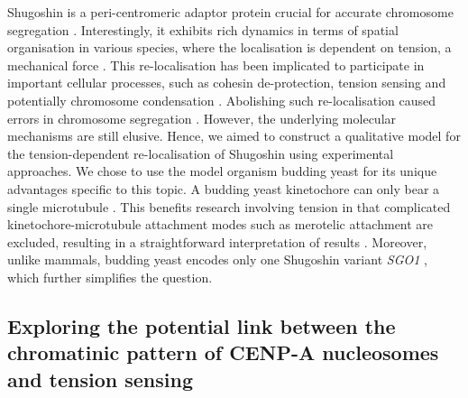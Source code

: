 Shugoshin is a peri-centromeric adaptor protein crucial for accurate chromosome segregation \citep{Marston2015, Zhang2020FunctioningMitosis}. Interestingly, it exhibits rich dynamics in terms of spatial organisation in various species, where the localisation is dependent on tension, a mechanical force \citep{Huang2007, Lee2008, Liu2013, Asai2020, Lee2008, Gomez2007, Eshleman2014, Nerusheva2014, Paldi2020ConvergentPericentromeres, Clarke2005, Kawashima2007}. This re-localisation has been implicated to participate in important cellular processes, such as cohesin de-protection, tension sensing and potentially chromosome condensation \citep{Indjeian2005a, Nerusheva2014, Su2021SumoylationAnaphase, Lee2008, Liu2013, Leonard2015, Kruitwagen2018}. Abolishing such re-localisation caused errors in chromosome segregation \citep{Su2021SumoylationAnaphase, Liu2013}. However, the underlying molecular mechanisms are still elusive. Hence, we aimed to construct a qualitative model for the tension-dependent re-localisation of Shugoshin using experimental approaches. We chose to use the model organism budding yeast for its unique advantages specific to this topic. A budding yeast kinetochore can only bear a single microtubule \citep{Biggins2013TheKinetochore}. This benefits research involving tension in that complicated kinetochore-microtubule attachment modes such as merotelic attachment are excluded, resulting in a straightforward interpretation of results \citep{Tanaka2010Kinetochore-microtubuleBi-orientation}. Moreover, unlike mammals, budding yeast encodes only one Shugoshin variant \textit{SGO1} \citep{Marston2015}, which further simplifies the question. 

\subsection{Exploring the potential link between the chromatinic pattern of CENP-A nucleosomes and tension sensing}


